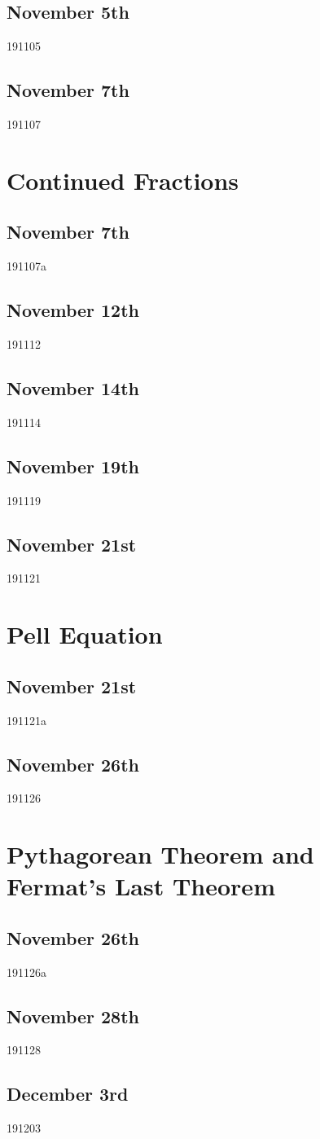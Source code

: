 \subsection{November 5th}
{191105}

\subsection{November 7th}
{191107}

\section{Continued Fractions}
\subsection{November 7th}
{191107a}

\subsection{November 12th}
{191112}

\subsection{November 14th}
{191114}

\subsection{November 19th}
{191119}

\subsection{November 21st}
{191121}

\section{Pell Equation}
\subsection{November 21st}
{191121a}

\subsection{November 26th}
{191126}

\section{Pythagorean Theorem and Fermat's Last Theorem}
\subsection{November 26th}
{191126a}

\subsection{November 28th}
{191128}

\subsection{December 3rd}
{191203}



